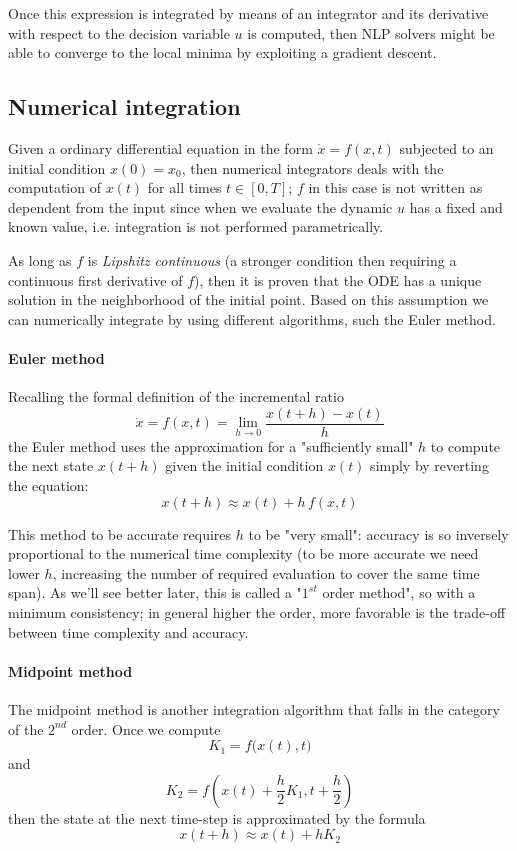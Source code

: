 	Once this expression is integrated by means of an integrator and its derivative with respect to the decision variable $u$ is computed, then NLP solvers might be able to converge to the local minima by exploiting a gradient descent.
	
\subsection{Numerical integration}
	Given a ordinary differential equation in the form $\dot x = f(x, t)$ subjected to an initial condition $x(0) = x_0$, then numerical integrators deals with the computation of $x(t)$ for all times $t\in [0,T]$; $f$ in this case is not written as dependent from the input  since when we evaluate the dynamic $u$ has a fixed and known value, i.e. integration is not performed parametrically.
	
	As long as $f$ is \textit{Lipshitz continuous} (a stronger condition then requiring a continuous first derivative of $f$), then it is proven that the ODE has a unique solution in the neighborhood of the initial point. Based on this assumption we can numerically integrate by using different algorithms, such the Euler method.
	
	\paragraph{Euler method} Recalling the formal definition of the incremental ratio
	\[ \dot x = f(x, t) = \lim_{h\rightarrow 0} \frac{x(t+h) - x(t)}{h} \]
	the Euler method uses the approximation for a "sufficiently small" $h$ to compute the next state $x(t+h)$ given the initial condition $x(t)$ simply by reverting the equation:
	\begin{equation} \label{eq:eulerintegration}
		x(t+h) \approx x(t) + h\, f(x, t)
	\end{equation}
	
	This method to be accurate requires $h$ to be "very small": accuracy is so inversely proportional to the numerical time complexity (to be more accurate we need lower $h$, increasing the number of required evaluation to cover the same time span). As we'll see better later, this is called a "$1^{st}$ order method", so with a minimum consistency; in general higher the order, more favorable is the trade-off between time complexity and accuracy.
	
	\paragraph{Midpoint method} The midpoint method is another integration algorithm that falls in the category of the $2^{nd}$ order. Once we compute
	\[ K_1 = f\big(x(t),t\big) \]
	and
	\[ K_2 = f \left( x(t) + \frac h 2 K_1, t + \frac h2\right) \]
	then the state at the next time-step is approximated by the formula
	\begin{equation}
		x(t+h) \approx x(t) + h K_2
	\end{equation}

